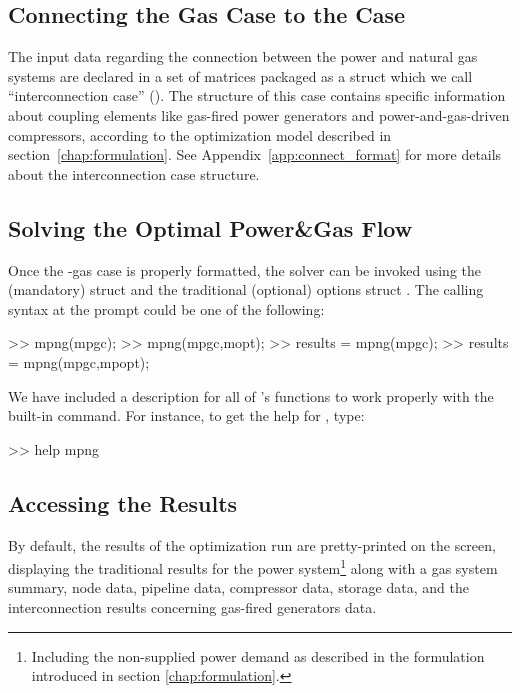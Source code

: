 \subsection{Connecting the Gas Case to the \matpower{} Case}
\label{subsec:connect_case}

The input data regarding the connection between the power and natural gas systems are declared in a set of matrices packaged as a \matlab{} struct which we call ``interconnection case'' (). The structure of this case contains specific information about coupling elements like gas-fired power generators and power-and-gas-driven compressors, according to the optimization model described in section~\ref{chap:formulation}. See Appendix~\ref{app:connect_format} for more details about the interconnection case structure.

\subsection{Solving the Optimal Power\&Gas Flow}
\label{subsec:solve_OPGF}

Once the \matpower{}-gas case is properly formatted, the solver can be invoked using the (mandatory)  struct and the traditional (optional) \matpower{} options struct . The calling syntax at the \matlab{} prompt could be one of the following:  

\begin{Code}
>> mpng(mpgc);
>> mpng(mpgc,mopt);
>> results = mpng(mpgc);	
>> results = mpng(mpgc,mpopt);
\end{Code}

We have included a description for all of \mpng{}'s functions to work properly with the built-in  command. For instance, to get the help for , type:

\begin{Code}
>> help mpng
\end{Code}

\subsection{Accessing the Results}
\label{subsec:view_results}

By default, the results of the optimization run are pretty-printed on the screen, displaying the traditional \matpower{} results for the power system\footnote{Including the non-supplied power demand as described in the formulation introduced in section \ref{chap:formulation}.} along with a gas system summary, node data, pipeline data, compressor data, storage data, and the interconnection results concerning gas-fired generators data.   

